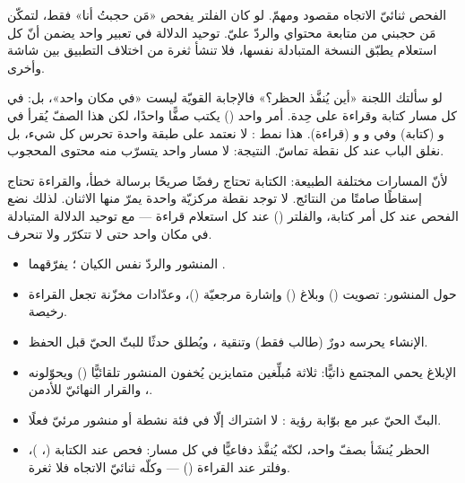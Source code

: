 \begin{secnote}
الفحص ثنائيّ الاتجاه مقصود ومهمّ. لو كان الفلتر يفحص «مَن حجبتُ أنا» فقط، لتمكّن مَن حجبني
من متابعة محتواي والردّ عليّ. توحيد الدلالة في تعبير  واحد يضمن أنّ
كل استعلام يطبّق النسخة المتبادلة نفسها، فلا تنشأ ثغرة من اختلاف التطبيق بين شاشة وأخرى.
\end{secnote}

\begin{spotlight}
لو سألتك اللجنة «أين يُنفَّذ الحظر؟» فالإجابة القويّة ليست «في مكان واحد»، بل: في كل
مسار كتابة وقراءة على حِدة. أمر واحد () يكتب صفًّا واحدًا، لكن هذا الصفّ
يُقرأ في  و (كتابة) وفي  و
و (قراءة). هذا نمط : لا نعتمد على طبقة واحدة
تحرس كل شيء، بل نغلق الباب عند كل نقطة تماسّ. النتيجة: لا مسار واحد يتسرّب منه محتوى المحجوب.
\end{spotlight}

\begin{qa}
لأنّ المسارات مختلفة الطبيعة: الكتابة تحتاج رفضًا صريحًا برسالة خطأ، والقراءة تحتاج
إسقاطًا صامتًا من النتائج. لا توجد نقطة مركزيّة واحدة يمرّ منها الاثنان. لذلك نضع
الفحص عند كل أمر كتابة، والفلتر () عند كل استعلام قراءة — مع توحيد
الدلالة المتبادلة في مكان واحد حتى لا تتكرّر ولا تنحرف.
\end{qa}

\begin{summary}
\begin{itemize}
\item المنشور والردّ نفس الكيان ؛ يفرّقهما .
\item حول المنشور: تصويت () وبلاغ () وإشارة مرجعيّة
  ()، وعدّادات مخزّنة تجعل القراءة رخيصة.
\item الإنشاء يحرسه دورٌ (طالب فقط) وتنقية ، ويُطلق حدثًا للبثّ الحيّ قبل الحفظ.
\item الإبلاغ يحمي المجتمع ذاتيًّا: ثلاثة مُبلِّغين متمايزين يُخفون المنشور تلقائيًّا
  () ويحوّلونه ، والقرار النهائيّ للأدمن.
\item البثّ الحيّ عبر  مع بوّابة رؤية : لا اشتراك إلّا في
  فئة نشطة أو منشور مرئيّ فعلًا.
\item الحظر يُنشَأ بصفّ  واحد، لكنّه يُنفَّذ دفاعيًّا في كل مسار: فحص عند
  الكتابة (، )، وفلتر عند القراءة ()
  — وكلّه ثنائيّ الاتجاه فلا ثغرة.
\end{itemize}
\end{summary}
